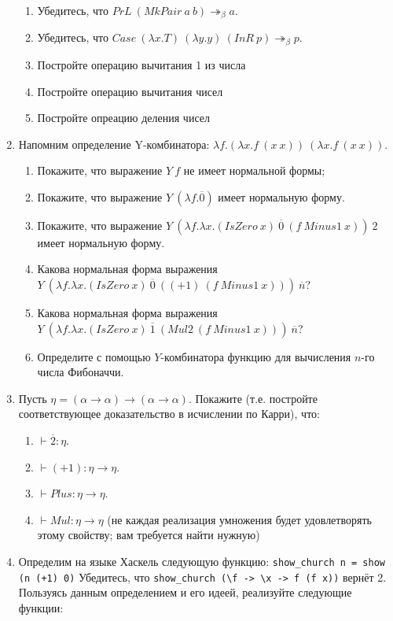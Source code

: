 \documentclass[10pt,a4paper,oneside]{article}
\begin{document}
\begin{enumerate}
\begin{enumerate}
\item Убедитесь, что $PrL\ (MkPair\ a\ b) \twoheadrightarrow_\beta a$.
\item Убедитесь, что $Case\ (\lambda x.T)\ (\lambda y.y)\ (InR\ p) \twoheadrightarrow_\beta p$.
\item Постройте операцию вычитания 1 из числа
\item Постройте операцию вычитания чисел
\item Постройте опреацию деления чисел
\end{enumerate}

\item Напомним определение Y-комбинатора: $\lambda f.(\lambda x.f\ (x\ x))\ (\lambda x.f\ (x\ x))$.
\begin{enumerate}
\item Покажите, что выражение $Y\ f$ не имеет нормальной формы;
\item Покажите, что выражение $Y\ (\lambda f.\overline{0})$ имеет нормальную форму.
\item Покажите, что выражение $Y\ (\lambda f.\lambda x.(IsZero\ x)\ \overline{0}\ (f\ Minus1\ x))\ 2$ имеет нормальную форму.
\item Какова нормальная форма выражения $Y\ (\lambda f.\lambda x.(IsZero\ x)\ \overline{0}\ ((+1)\ (f\ Minus1\ x)))\ \overline{n}$?
\item Какова нормальная форма выражения $Y\ (\lambda f.\lambda x.(IsZero\ x)\ \overline{1}\ (Mul2\ (f\ Minus1\ x)))\ \overline{n}$?
\item Определите с помощью $Y$-комбинатора функцию для вычисления $n$-го числа Фибоначчи.
\end{enumerate}

\item Пусть $\eta = (\alpha\rightarrow\alpha)\rightarrow(\alpha\rightarrow\alpha)$. Покажите (т.е. постройте
соответствующее доказательство в исчислении по Карри), что:
\begin{enumerate}
\item $\vdash \overline{2} : \eta$.
\item $\vdash (+1) : \eta\rightarrow\eta$.
\item $\vdash Plus : \eta\rightarrow\eta$.
\item $\vdash Mul : \eta\rightarrow\eta$ (не каждая реализация умножения будет удовлетворять этому свойству;
вам требуется найти нужную)
\end{enumerate}

\item Определим на языке Хаскель следующую функцию: \verb!show_church n = show (n (+1) 0)!
Убедитесь, что \verb!show_church (\f -> \x -> f (f x))! вернёт 2. 
Пользуясь данным определением и его идеей, реализуйте следующие функции:


\end{enumerate}
\end{document}

